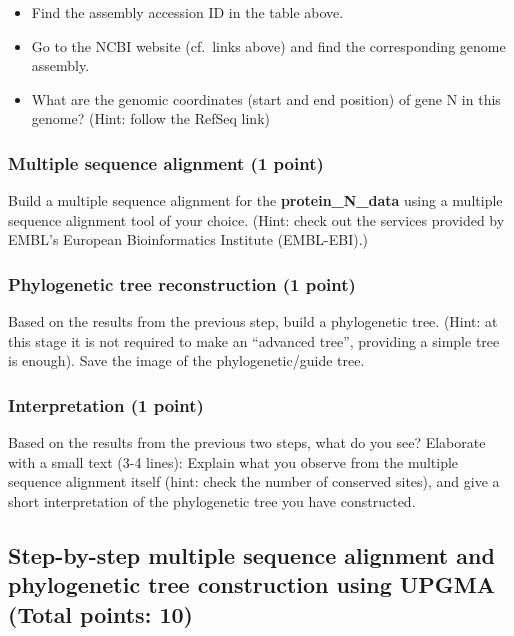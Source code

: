 \documentclass[
  a4paper,
  DIV=11,
  numbers=noendperiod]{scrartcl}
\providecommand{\tightlist}{%
  \setlength{\itemsep}{0pt}\setlength{\parskip}{0pt}}\usepackage{longtable,booktabs,array}
\begin{document}
\begin{itemize}
\tightlist
\item
  Find the assembly accession ID in the table above.
\item
  Go to the NCBI website (cf.~links above) and find the corresponding
  genome assembly.
\item
  What are the genomic coordinates (start and end position) of gene N in
  this genome? (Hint: follow the RefSeq link)
\end{itemize}

\hypertarget{multiple-sequence-alignment-1-point}{%
\subsubsection{Multiple sequence alignment (1
point)}\label{multiple-sequence-alignment-1-point}}

Build a multiple sequence alignment for the \textbf{protein\_N\_data}
using a multiple sequence alignment tool of your choice. (Hint: check
out the services provided by EMBL's European Bioinformatics Institute
(EMBL-EBI).)

\hypertarget{sec-phylo-1}{%
\subsubsection{Phylogenetic tree reconstruction (1
point)}\label{sec-phylo-1}}

Based on the results from the previous step, build a phylogenetic tree.
(Hint: at this stage it is not required to make an ``advanced tree'',
providing a simple tree is enough). Save the image of the
phylogenetic/guide tree.

\hypertarget{interpretation-1-point}{%
\subsubsection{Interpretation (1 point)}\label{interpretation-1-point}}

Based on the results from the previous two steps, what do you see?
Elaborate with a small text (3-4 lines): Explain what you observe from
the multiple sequence alignment itself (hint: check the number of
conserved sites), and give a short interpretation of the phylogenetic
tree you have constructed.

\hypertarget{step-by-step-multiple-sequence-alignment-and-phylogenetic-tree-construction-using-upgma-total-points-10}{%
\subsection{Step-by-step multiple sequence alignment and phylogenetic
tree construction using UPGMA (Total points:
10)}\label{step-by-step-multiple-sequence-alignment-and-phylogenetic-tree-construction-using-upgma-total-points-10}}
\end{document}
